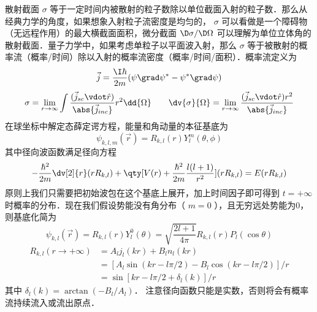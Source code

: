 
散射截面 $\sigma$ 等于一定时间内被散射的粒子数除以单位截面入射的粒子数．那么从经典力学的角度，如果想象入射粒子流密度是均匀的， $\sigma$ 可以看做是一个障碍物（无远程作用）的最大横截面面积，微分截面 $\D \sigma/\D\Omega$ 可以理解为单位立体角的散射截面．量子力学中，如果考虑单粒子以平面波入射，那么 $\sigma$ 等于被散射的概率流（概率/时间）除以入射的概率流密度（概率/时间/面积）．概率流定义为
\begin{equation}
\vec j = \frac{\I\hbar }{2m}(\psi \grad \psi^* - \psi^* \grad \psi )
\end{equation}
\begin{equation}\label{ParWav_eq3}
\sigma  = \lim_{r \to \infty} \int \frac{(\vec j_{sc} \vdot \hat r)}{\abs{{\vec j}_{inc}}} r^2\dd{\Omega} 
\qquad
\dv{\sigma}{\Omega} = \lim_{r\to\infty} \frac{(\vec j_{sc} \vdot \hat r) r^2}{\abs{\vec j_{inc}}}
\end{equation}
在球坐标中解定态薛定谔方程，能量和角动量的本征基底为
\begin{equation}
\psi_{k,l,m}(\vec r) = R_{k,l}(r) Y_l^m(\theta, \phi )
\end{equation}
其中径向波函数满足径向方程
\begin{equation}\label{ParWav_eq4}
-\frac{\hbar^2}{2m} \dv[2]{r} (rR_{k,l}) + \qty[V(r) + \frac{\hbar^2}{2m} \frac{l(l + 1)}{r^2}](r R_{k,l}) = E(rR_{k,l})
\end{equation}
原则上我们只需要把初始波包在这个基底上展开，加上时间因子即可得到 $t =  + \infty$ 时概率的分布．现在我们假设势能没有角分布（ $m = 0$ ），且无穷远处势能为0，则基底化简为
\begin{equation}
\psi_{k,l}(\vec r) = R_{k,l}(r) Y_l^0(\theta ) = \sqrt{\frac{2l + 1}{4\pi }} R_{k,l}(r) P_l(\cos\theta)
\end{equation}
\begin{equation}\begin{aligned}\label{ParWav_eq6}
R_{k,l}(r \to + \infty) &= A_l j_l(kr) + B_l n_l(kr) \\
&= [A_l\sin(kr - l\pi /2) - B_l\cos(kr - l\pi /2)]/r \\
&= \sin [kr - l\pi /2 + \delta_l(k)]/r
\end{aligned}\end{equation}
其中 $\delta_l(k) = \arctan(- B_l/A_l)$． 注意径向函数只能是实数，否则将会有概率流持续流入或流出原点．

